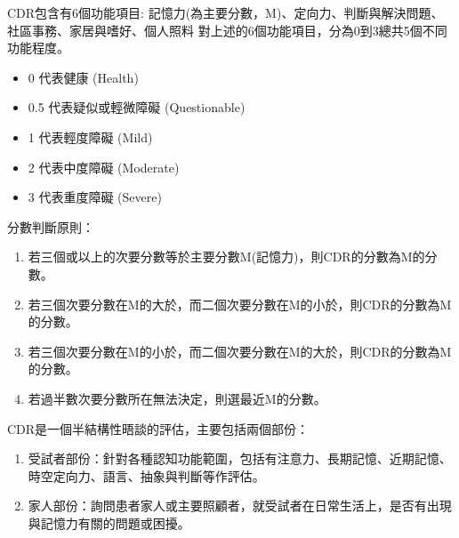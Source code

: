 CDR包含有6個功能項目:
記憶力(為主要分數，M)、定向力、判斷與解決問題、社區事務、家居與嗜好、個人照料
對上述的6個功能項目，分為0到3總共5個不同功能程度。

\begin{itemize}
    \item
    0 代表健康 (Health)
    \item
    0.5 代表疑似或輕微障礙 (Questionable)
    \item
    1 代表輕度障礙 (Mild)
    \item
    2 代表中度障礙 (Moderate)
    \item
    3 代表重度障礙 (Severe)
\end{itemize}

分數判斷原則：
\begin{enumerate}
\item
若三個或以上的次要分數等於主要分數M(記憶力)，則CDR的分數為M的分數。
\item
若三個次要分數在M的大於，而二個次要分數在M的小於，則CDR的分數為M的分數。
\item
若三個次要分數在M的小於，而二個次要分數在M的大於，則CDR的分數為M的分數。
\item
若過半數次要分數所在無法決定，則選最近M的分數。
\end{enumerate}

CDR是一個半結構性晤談的評估，主要包括兩個部份：
\begin{enumerate}
	\item
受試者部份：針對各種認知功能範圍，包括有注意力、長期記憶、近期記憶、時空定向力、語言、抽象與判斷等作評估。
\item
家人部份：詢問患者家人或主要照顧者，就受試者在日常生活上，是否有出現與記憶力有關的問題或困擾。
\end{enumerate}

